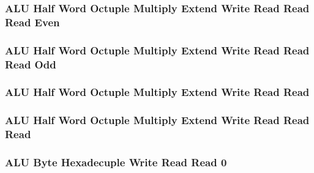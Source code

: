 \subsubsection[{\small ALU Half Word Octuple Multiply Extend Write Read Read Read Even}]{ALU Half Word Octuple Multiply Extend Write Read Read Read Even} \label{sec:format-ALU-HOMEWRRRE}



\subsubsection[{\small ALU Half Word Octuple Multiply Extend Write Read Read Read Odd}]{ALU Half Word Octuple Multiply Extend Write Read Read Read Odd} \label{sec:format-ALU-HOMEWRRRO}



\subsubsection[{\small ALU Half Word Octuple Multiply Extend Write Read Read}]{ALU Half Word Octuple Multiply Extend Write Read Read} \label{sec:format-ALU-HOMXWRR}



\subsubsection[{\small ALU Half Word Octuple Multiply Extend Write Read Read Read}]{ALU Half Word Octuple Multiply Extend Write Read Read Read} \label{sec:format-ALU-HOMXWRRR}



\subsubsection[{\small ALU Byte Hexadecuple Write Read Read 0}]{ALU Byte Hexadecuple Write Read Read 0} \label{sec:format-ALU-BXWRR0}



